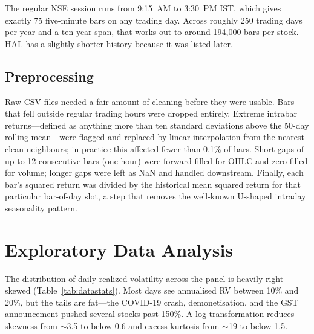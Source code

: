 The regular NSE session runs from 9:15~AM to 3:30~PM IST, which gives exactly 75 five-minute bars on any trading day. Across roughly 250 trading days per year and a ten-year span, that works out to around 194,000 bars per stock. HAL has a slightly shorter history because it was listed later.

\subsection{Preprocessing}

Raw CSV files needed a fair amount of cleaning before they were usable. Bars that fell outside regular trading hours were dropped entirely. Extreme intrabar returns---defined as anything more than ten standard deviations above the 50-day rolling mean---were flagged and replaced by linear interpolation from the nearest clean neighbours; in practice this affected fewer than 0.1\% of bars. Short gaps of up to 12 consecutive bars (one hour) were forward-filled for OHLC and zero-filled for volume; longer gaps were left as NaN and handled downstream. Finally, each bar's squared return was divided by the historical mean squared return for that particular bar-of-day slot, a step that removes the well-known U-shaped intraday seasonality pattern.

\section{Exploratory Data Analysis}

The distribution of daily realized volatility across the panel is heavily right-skewed (Table~\ref{tab:datastats}). Most days see annualised RV between 10\% and 20\%, but the tails are fat---the COVID-19 crash, demonetisation, and the GST announcement pushed several stocks past 150\%. A log transformation reduces skewness from $\sim$3.5 to below 0.6 and excess kurtosis from $\sim$19 to below 1.5.

